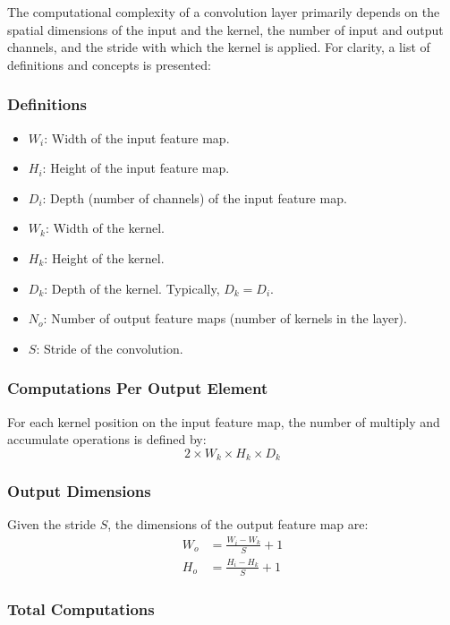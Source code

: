 The computational complexity of a convolution layer primarily depends on the spatial dimensions of the input and the kernel, the number of input and output channels, and the stride with which the kernel is applied. For clarity, a list of definitions and concepts is presented:

\subsubsection{Definitions}
\begin{itemize}
	\item \( W_i \): Width of the input feature map.
	\item \( H_i \): Height of the input feature map.
	\item \( D_i \): Depth (number of channels) of the input feature map.
	\item \( W_k \): Width of the kernel.
	\item \( H_k \): Height of the kernel.
	\item \( D_k \): Depth of the kernel. Typically, \( D_k = D_i \).
	\item \( N_o \): Number of output feature maps (number of kernels in the layer).
	\item \( S \): Stride of the convolution.
\end{itemize}

\subsubsection{Computations Per Output Element}

For each kernel position on the input feature map, the number of multiply and accumulate operations is defined by:
\begin{equation}
2 \times W_k \times H_k \times D_k
\end{equation}

\subsubsection{Output Dimensions}

Given the stride \( S \), the dimensions of the output feature map are:
\begin{align}
W_o &= \frac{W_i - W_k}{S} + 1 \\
H_o &= \frac{H_i - H_k}{S} + 1
\end{align}

\subsubsection{Total Computations}

